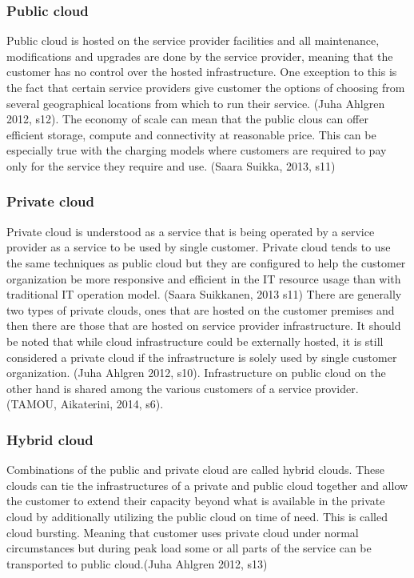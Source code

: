 \documentclass{article}
\begin{document}
\subsubsection{Public cloud}
Public cloud is hosted on the service provider facilities and all maintenance, modifications and upgrades are done by the service provider, meaning that the customer has no control over the hosted infrastructure. One exception to this is the fact that certain service providers give customer the options of choosing from several geographical locations from which to run their service. (Juha Ahlgren 2012, s12).
The economy of scale can mean that the public clous can offer efficient storage, compute and connectivity at reasonable price. This can be especially true with the charging models where customers are required to pay only for the service they require and use. (Saara Suikka, 2013, s11)
\subsubsection{Private cloud}
Private cloud is understood as a service that is being operated by a service provider as a service to be used by single customer. Private cloud tends to use the same techniques as public cloud but they are configured to help the customer organization be more responsive and efficient in the IT resource usage than with traditional IT operation model. (Saara Suikkanen, 2013 s11)
There are generally two types of private clouds, ones that are hosted on the customer premises and then there are those that are hosted on service provider infrastructure. It should be noted that while cloud infrastructure could be externally hosted, it is still considered a private cloud if the infrastructure is solely used by single customer organization. (Juha Ahlgren 2012, s10).
Infrastructure on public cloud on the other hand is shared among the various customers of a service provider. (TAMOU, Aikaterini, 2014, s6).
\subsubsection{Hybrid cloud}
Combinations of the public and private cloud are called hybrid clouds. These clouds can tie the infrastructures of a private and public cloud together and allow the customer to extend their capacity beyond what is available in the private cloud by additionally utilizing the public cloud on time of need. This is called cloud bursting. Meaning that customer uses private cloud under normal circumstances but during peak load some or all parts of the service can be transported to public cloud.(Juha Ahlgren 2012, s13)
\end{document}
